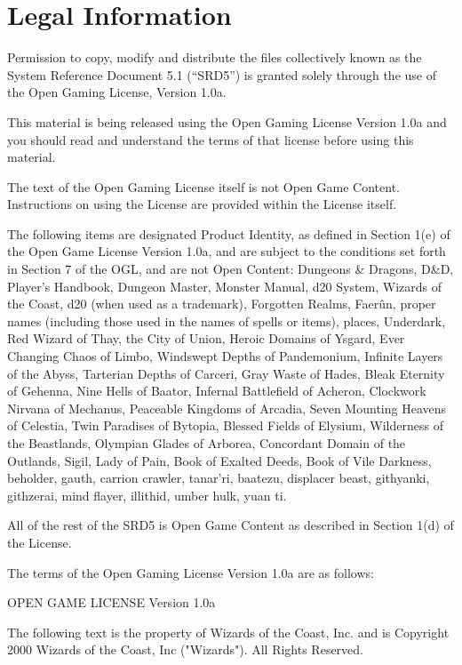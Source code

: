 \documentclass[
]{article}
\date{}
\begin{document}
\hypertarget{legal-information}{%
\section{Legal Information}\label{legal-information}}

Permission to copy, modify and distribute the files collectively known
as the System Reference Document 5.1 (``SRD5'') is granted solely
through the use of the Open Gaming License, Version 1.0a.

This material is being released using the Open Gaming License Version
1.0a and you should read and understand the terms of that license before
using this material.

The text of the Open Gaming License itself is not Open Game Content.
Instructions on using the License are provided within the License
itself.

The following items are designated Product Identity, as defined in
Section 1(e) of the Open Game License Version 1.0a, and are subject to
the conditions set forth in Section 7 of the OGL, and are not Open
Content: Dungeons \& Dragons, D\&D, Player's Handbook, Dungeon Master,
Monster Manual, d20 System, Wizards of the Coast, d20 (when used as a
trademark), Forgotten Realms, Faerûn, proper names (including those used
in the names of spells or items), places, Underdark, Red Wizard of Thay,
the City of Union, Heroic Domains of Ysgard, Ever Changing Chaos of
Limbo, Windswept Depths of Pandemonium, Infinite Layers of the Abyss,
Tarterian Depths of Carceri, Gray Waste of Hades, Bleak Eternity of
Gehenna, Nine Hells of Baator, Infernal Battlefield of Acheron,
Clockwork Nirvana of Mechanus, Peaceable Kingdoms of Arcadia, Seven
Mounting Heavens of Celestia, Twin Paradises of Bytopia, Blessed Fields
of Elysium, Wilderness of the Beastlands, Olympian Glades of Arborea,
Concordant Domain of the Outlands, Sigil, Lady of Pain, Book of Exalted
Deeds, Book of Vile Darkness, beholder, gauth, carrion crawler,
tanar'ri, baatezu, displacer beast, githyanki, githzerai, mind flayer,
illithid, umber hulk, yuan ti.

All of the rest of the SRD5 is Open Game Content as described in Section
1(d) of the License.

The terms of the Open Gaming License Version 1.0a are as follows:

OPEN GAME LICENSE Version 1.0a

The following text is the property of Wizards of the Coast, Inc. and is
Copyright 2000 Wizards of the Coast, Inc ("Wizards"). All Rights
Reserved.
\end{document}
